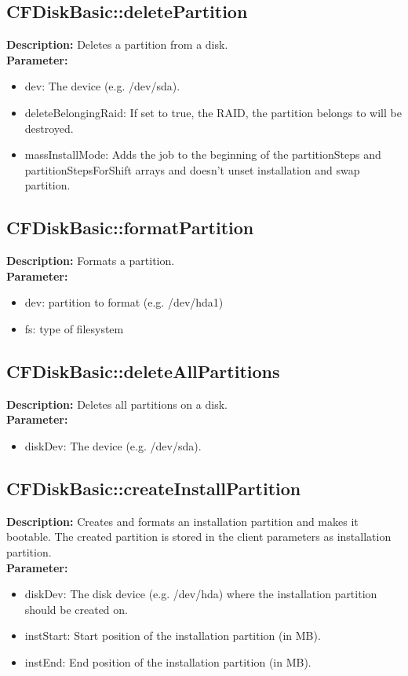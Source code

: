 \subsection{CFDiskBasic::deletePartition}
\textbf{Description:} Deletes a partition from a disk.\\
\textbf{Parameter:}
\begin{itemize}
\item dev: The device (e.g. /dev/sda).
\item deleteBelongingRaid: If set to true, the RAID, the partition belongs to will be destroyed.
\item massInstallMode: Adds the job to the beginning of the partitionSteps and partitionStepsForShift arrays and doesn't unset installation and swap partition.
\end{itemize}

\subsection{CFDiskBasic::formatPartition}
\textbf{Description:} Formats a partition.\\
\textbf{Parameter:}
\begin{itemize}
\item dev: partition to format (e.g. /dev/hda1)
\item fs: type of filesystem
\end{itemize}

\subsection{CFDiskBasic::deleteAllPartitions}
\textbf{Description:} Deletes all partitions on a disk.\\
\textbf{Parameter:}
\begin{itemize}
\item diskDev: The device (e.g. /dev/sda).
\end{itemize}

\subsection{CFDiskBasic::createInstallPartition}
\textbf{Description:} Creates and formats an installation partition and makes it bootable. The created partition is stored in the client parameters as installation partition.\\
\textbf{Parameter:}
\begin{itemize}
\item diskDev: The disk device (e.g. /dev/hda) where the installation partition should be created on.
\item instStart: Start position of the installation partition (in MB).
\item instEnd: End position of the installation partition (in MB).
\end{itemize}

